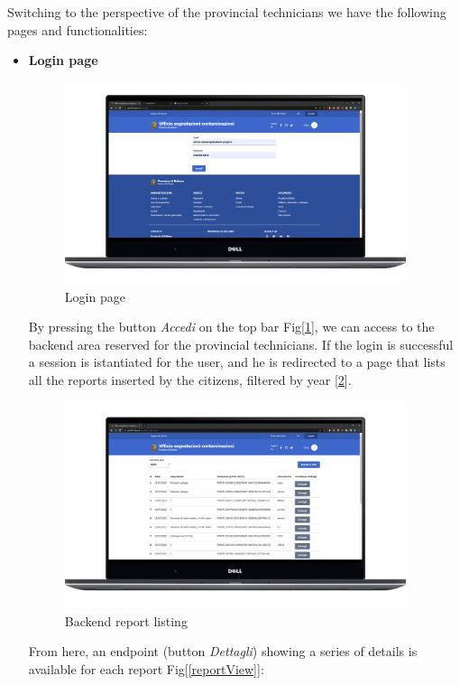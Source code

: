 \begin{itemize}
igure}[H] \centering \texttt{[image: img/tablet.png]} \caption{Tablet interface} \label{tablet} \end{figure}
\end{itemize} 
\pagebreak
Switching to the perspective of the provincial technicians we have the following pages and functionalities:
\begin{itemize}
    \item \textbf{Login page} \\
    \begin{figure}[H]\centering \includegraphics[width=27em]{img/login.png} \caption{Login page} \label{login} \end{figure}
    By pressing the button \textit{Accedi} on the top bar Fig[\ref{login}], we can access to the backend area reserved for the provincial technicians.
    If the login is successful a session is istantiated for the user, and he is redirected to a page that lists all the reports inserted by the citizens, filtered by year [\ref{backendListing}].
    \begin{figure}[H] \centering \includegraphics[width=27em]{img/home_back.png} \caption{Backend report listing} \label{backendListing}\end{figure}
    From here, an endpoint (button \textit{Dettagli}) showing a series of details is available for each report Fig[\ref{reportView}]:
    \begin{enumerate}

\end{enumerate}
\end{itemize}
